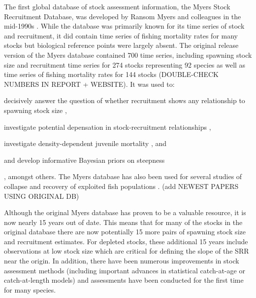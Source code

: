 \documentclass[letterpaper,12pt]{article}
\begin{document}
The first global database of stock assessment information, the Myers
Stock Recruitment Database, was developed by Ransom Myers and
colleagues in the mid-1990s \citep{Myers:etal:1995:summary}.  While the database
was primarily known for its time series of stock and recruitment, it
did contain time series of fishing mortality rates for many stocks but
biological reference points were largely absent. The original release
version of the Myers database \citep{Myers:etal:1995:summary} contained 700 time
series, including spawning stock size and recruitment time series for
274 stocks representing 92 species as well as time series of fishing
mortality rates for 144 stocks (DOUBLE-CHECK NUMBERS IN REPORT +
WEBSITE). It was used to: \begin{inparaenum}[1\upshape)] \item decisively answer the question of whether recruitment shows any
relationship to spawning stock size \citep{Myers:Barrowman:1996:fishbull}, \item investigate potential depensation in stock-recruitment relationships
\citep{Myers:etal:1995:science, Liermann:Hilborn:1997:cjfas}, \item investigate
density-dependent juvenile mortality \citep{Myers:2001:ices,
  Minto:etal:2008:nature}, and \item and develop informative Bayesian priors on
steepness \citep{Myers:etal:1999:cjfas, Myers:etal:2002:najfm, Dorn:2002:najfm} \end{inparaenum}, amongst
others.  The Myers database has also been used for several studies of
collapse and recovery of exploited fish populations \citep{Hutchings:2000:nature, Hutchings:2001:jfishb, Hilborn:1997:csiro}. (add NEWEST PAPERS USING ORIGINAL DB)
\citep{Garvey:etal:2009:cjfas}

Although the original Myers database \citep{Myers:etal:1995:summary} has proven
to be a valuable resource, it is now nearly 15 years out of date.
This means that for many of the stocks in the original database there
are now potentially 15 more pairs of spawning stock size and
recruitment estimates.  For depleted stocks, these additional 15 years
include observations at low stock size which are critical for defining
the slope of the SRR near the origin.  In addition, there have been
numerous improvements in stock assessment methods (including important
advances in statistical catch-at-age or catch-at-length models) and
assessments have been conducted for the first time for many species.
\end{document}
